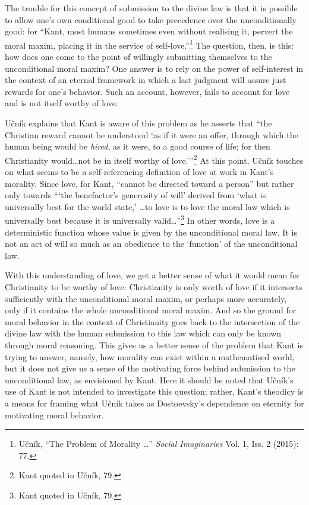 \documentclass[12pt]{article}
\begin{document}
	The trouble for this concept of submission to the divine law is that it is possible to allow one's own conditional good to take precedence over the unconditionally good: for ``Kant, most humans sometimes even without realising it, pervert the moral maxim, placing it in the service of self-love.''\footnote{U\v{c}n\'{i}k, ``The Problem of Morality \ldots'' \emph{Social Imaginaries} Vol. 1, Iss. 2 (2015): 77.} The question, then, is this: how does one come to the point of willingly submitting themselves to the unconditional moral maxim? One answer is to rely on the power of self-interest in the context of an eternal framework in which a last judgment will assure just rewards for one's behavior. Such an account, however, fails to account for love and is not itself worthy of love. 
	
	U\v{c}n\'{i}k explains that Kant is aware of this problem as he asserts that ``the Christian reward cannot be understood `as if it were an offer, through which the human being would be \emph{hired}, as it were, to a good course of life; for then Christianity would\ldots not be in itself worthy of love.'\thinspace''\footnote{Kant quoted in U\v{c}n\'{i}k, 79.} At this point, U\v{c}n\'{i}k touches on what seems to be a self-referencing definition of love at work in Kant's morality. Since love, for Kant, ``cannot be directed toward a person'' but rather only towards ``\thinspace`the benefactor's generosity of will' derived from `what is universally best for the world state,' \ldots to love is to love the moral law which is universally best because it is universally valid\ldots''\footnote{Kant quoted in U\v{c}n\'{i}k, 79.} In other words, love is a deterministic function whose value is given by the unconditional moral law. It is not an act of will so much as an obedience to the `function' of the unconditional law. 
	
	With this understanding of love, we get a better sense of what it would mean for Christianity to be worthy of love: Christianity is only worth of love if it intersects sufficiently with the unconditional moral maxim, or perhaps more accurately, only if it contains the whole unconditional moral maxim. And so the ground for moral behavior in the context of Christianity goes back to the intersection of the divine law with the human submission to this law which can only be known through moral reasoning. This gives us a better sense of the problem that Kant is trying to answer, namely, how morality can exist within a mathematised world, but it does not give us a sense of the motivating force behind submission to the unconditional law, as envisioned by Kant. Here it should be noted that U\v{c}n\'{i}k's use of Kant is not intended to investigate this question; rather, Kant's theodicy is a means for framing what U\v{c}n\'{i}k takes as Dostoevsky's dependence on eternity for motivating moral behavior. 
	
\end{document}
